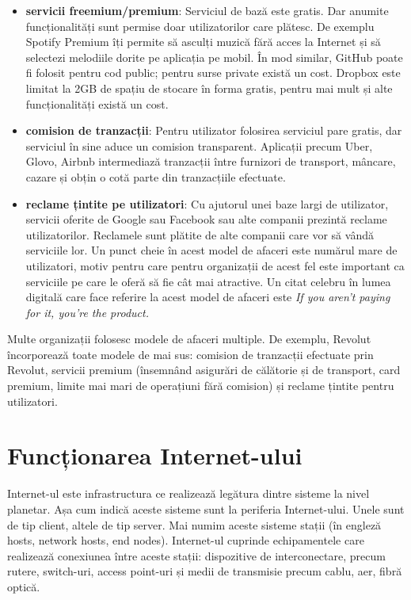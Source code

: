 \begin{itemize}
  \item \textbf{servicii freemium/premium}: Serviciul de bază este gratis. Dar anumite funcționalități sunt permise doar utilizatorilor care plătesc. De exemplu Spotify Premium îți permite să asculți muzică fără acces la Internet și să selectezi melodiile dorite pe aplicația pe mobil. În mod similar, GitHub poate fi folosit pentru cod public; pentru surse private există un cost. Dropbox este limitat la 2GB de spațiu de stocare în forma gratis, pentru mai mult și alte funcționalități există un cost.
  \item \textbf{comision de tranzacții}: Pentru utilizator folosirea serviciul pare gratis, dar serviciul în sine aduce un comision transparent. Aplicații precum Uber, Glovo, Airbnb intermediază tranzacții între furnizori de transport, mâncare, cazare și obțin o cotă parte din tranzacțiile efectuate.
  \item \textbf{reclame țintite pe utilizatori}: Cu ajutorul unei baze largi de utilizator, servicii oferite de Google sau Facebook sau alte companii prezintă reclame utilizatorilor. Reclamele sunt plătite de alte companii care vor să vândă serviciile lor. Un punct cheie în acest model de afaceri este numărul mare de utilizatori, motiv pentru care pentru organizații de acest fel este important ca serviciile pe care le oferă să fie cât mai atractive. Un citat celebru în lumea digitală care face referire la acest model de afaceri este \textit{If you aren’t paying for it, you’re the product.}
\end{itemize}

Multe organizații folosesc modele de afaceri multiple. De exemplu, Revolut încorporează toate modele de mai sus: comision de tranzacții efectuate prin Revolut, servicii premium (însemnând asigurări de călătorie și de transport, card premium, limite mai mari de operațiuni fără comision) și reclame țintite pentru utilizatori.

\section{Funcționarea Internet-ului}
\label{sec:net:internet}

Internet-ul este infrastructura ce realizează legătura dintre sisteme la nivel planetar. Așa cum indică  aceste sisteme sunt la periferia Internet-ului. Unele sunt de tip client, altele de tip server. Mai numim aceste sisteme stații (în engleză hosts, network hosts, end nodes). Internet-ul cuprinde echipamentele care realizează conexiunea între aceste stații: dispozitive de interconectare, precum rutere, switch-uri, access point-uri și medii de transmisie precum cablu, aer, fibră optică.

